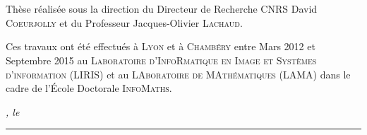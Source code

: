 %
%
%
\chapter*{}%
\label{sec:declaration}
\thispagestyle{empty}

\bigskip
\vfill

\noindent Thèse réalisée sous la direction du Directeur de Recherche CNRS David
\textsc{Coeurjolly} et du Professeur Jacques-Olivier \textsc{Lachaud}.

\noindent Ces travaux ont été effectués à \textsc{Lyon} et à \textsc{Chambéry}
entre Mars 2012 et Septembre 2015 au \textsc{Laboratoire d'InfoRmatique en Image
et Systèmes d'information} (\textsc{LIRIS}) et au \textsc{LAboratoire de
MAthématiques} (\textsc{LAMA}) dans le cadre de l'École Doctorale
\textsc{InfoMaths}.

\noindent\textit{\thesisUniversityCity, le \thesisDate}

\smallskip




\begin{flushright}
	\begin{minipage}{5cm}
		\rule{\textwidth}{1pt}
	\end{minipage}\\
	\begin{minipage}{8cm}
		\centering\thesisTitle
	\end{minipage}
\end{flushright}




